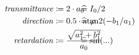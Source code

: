 \begin{align}
\begin{split}
\mathit{transmittance} &\coloneqq 2 \cdot a_0 \vphantom{I_0/2} \\
\mathit{direction} &\coloneqq 0.5 \cdot \atantwo(-b_1 / a_1) \vphantom{\varphi} \\
\mathit{retardation} &\coloneqq \frac{\sqrt{a_1^2 + b_1^2}}{a_0}  \vphantom{\sin(...)} 
\end{split}
\hspace{-7em}
\begin{split}
& \mathrel{\widehat{=}} I_0/2 \vphantom{2 \cdot a_0}\\
& \mathrel{\widehat{=}} \varphi \vphantom{0.5 \cdot \atantwo(-b_1 / a_1)} \\
& \mathrel{\widehat{=}} \sin(...) \vphantom{\frac{\sqrt{a_1^2 + b_1^2}}{a_0}}
\end{split}
\end{align}
% 
% 
